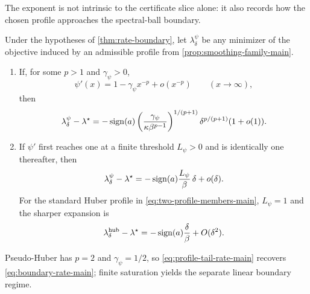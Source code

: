 The exponent is not intrinsic to the certificate slice alone: it also records
how the chosen profile approaches the spectral-ball boundary.

\begin{corollary}
\label{cor:profile-tail-rate-main}
Under the hypotheses of \cref{thm:rate-boundary}, let
\(\lambda_\delta^\psi\) be any minimizer of the objective induced by an admissible
profile from \cref{prop:smoothing-family-main}.
\begin{enumerate}
 \item If, for some \(p>1\) and \(\gamma_\psi>0\),
 \begin{equation}
  \psi'(x)=1-\gamma_\psi x^{-p}+o(x^{-p})
  \qquad(x\to\infty),
  \label{eq:profile-polynomial-tail-main}
 \end{equation}
 then
 \begin{equation}
  \lambda_\delta^\psi-\lambda^\star
  =-\operatorname{sign}(a)
  \left(\frac{\gamma_\psi}{\kappa\beta^{p-1}}\right)^{1/(p+1)}
  \delta^{p/(p+1)}(1+o(1)).
  \label{eq:profile-tail-rate-main}
 \end{equation}
 \item If \(\psi'\) first reaches one at a finite threshold
 \(L_\psi>0\) and is identically one thereafter, then
 \begin{equation}
  \lambda_\delta^\psi-\lambda^\star
  =-\operatorname{sign}(a)\frac{L_\psi}{\beta}\,\delta+o(\delta).
  \label{eq:saturated-boundary-rate-main}
 \end{equation}
 For the standard Huber profile in \eqref{eq:two-profile-members-main},
 \(L_\psi=1\) and the sharper expansion is
 \begin{equation}
  \lambda_\delta^{\rm hub}-\lambda^\star
  =-\operatorname{sign}(a)\frac{\delta}{\beta}+O(\delta^2).
  \label{eq:huber-boundary-rate-main}
 \end{equation}
\end{enumerate}
Pseudo-Huber has \(p=2\) and \(\gamma_\psi=1/2\), so
\eqref{eq:profile-tail-rate-main} recovers
\eqref{eq:boundary-rate-main}; finite saturation yields the separate linear
boundary regime.
\end{corollary}

